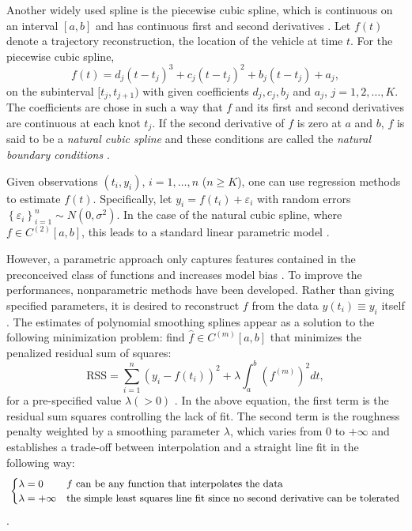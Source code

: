 Another widely used spline is the piecewise cubic spline, which is continuous on an interval $[a,b]$ and has continuous first and second derivatives \citep{wolberg1988cubic}. Let $f(t)$ denote a trajectory reconstruction, \ie the location of the vehicle at time $t$. For the piecewise cubic spline,  
\begin{equation*}
f(t)=d_j(t-t_j)^3+c_j(t-t_j)^2+b_j(t-t_j)+a_j,
\end{equation*}
on the subinterval $[t_j,t_{j+1})$ with given coefficients $d_j, c_j, b_j$ and $a_j$, $j=1,2,\ldots,K$. The coefficients are chose in such a way that $f$ and its first and second derivatives are continuous at each knot $t_j$. If the second derivative of $f$ is zero at $a$ and $b$, $f$ is said to be a \textit{natural cubic spline} and these conditions are called the \textit{natural boundary conditions}  \citep{green1993nonparametric}. 


Given observations $\left(t_i,y_i\right)$, $i=1,\ldots,n$ ($n\geq K$), one can use regression methods to estimate $f(t)$. Specifically, let $y_i=f(t_i)+\varepsilon_i$ with random errors $\left\lbrace \varepsilon_i\right\rbrace_{i=1}^n \sim N\left(0,\sigma^2\right)$. In the case of the natural cubic spline, where $f\in \mathit{C}^{(2)}[a,b]$, this leads to a standard linear parametric model \citep{kim2004smoothing}. 


However, a parametric approach only captures features contained in the preconceived class of functions and increases model bias \citep{yao2005functional}. To improve the performances, nonparametric methods have been developed. Rather than giving specified parameters, it is desired to reconstruct $f$ from the data $y(t_i)\equiv y_i$ itself  \citep{craven1978smoothing}. The estimates of polynomial smoothing splines appear as a solution to the following minimization problem: find $\hat{f} \in \mathit{C}^{(m)}[a,b]$ that minimizes the penalized residual sum of squares: 
\begin{equation}\label{introSmoothingOb}
\mbox{RSS}=\sum_{i=1}^{n}\left(y_i-f(t_i)\right)^2+\lambda\int_a^b \left(f^{(m)}\right)^2dt, 
\end{equation}
for a pre-specified value $\lambda(>0)$ \citep{aydin2012smoothing}. In the above equation, the first term is the residual sum squares controlling the lack of fit. The second term is the roughness penalty weighted by a smoothing parameter $\lambda$, which varies from $0$ to $+\infty$ and establishes a trade-off between interpolation and a  straight line fit in the following way: 
\begin{align*}\small 
\begin{cases}
\lambda = 0  & \mbox{$f$ can be any function that interpolates the data}\\
\lambda = +\infty & \mbox{the simple least squares line fit since no second derivative can be tolerated}
\end{cases}
\end{align*}\citep{esl2009}. 

